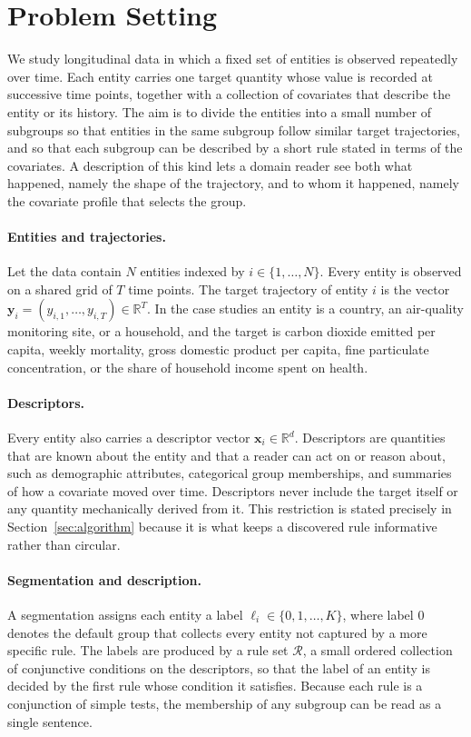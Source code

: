 \section{Problem Setting}
\label{sec:problem}

We study longitudinal data in which a fixed set of entities is observed repeatedly over time. Each entity carries one target quantity whose value is recorded at successive time points, together with a collection of covariates that describe the entity or its history. The aim is to divide the entities into a small number of subgroups so that entities in the same subgroup follow similar target trajectories, and so that each subgroup can be described by a short rule stated in terms of the covariates. A description of this kind lets a domain reader see both what happened, namely the shape of the trajectory, and to whom it happened, namely the covariate profile that selects the group.

\paragraph{Entities and trajectories.} Let the data contain $N$ entities indexed by $i \in \{1, \dots, N\}$. Every entity is observed on a shared grid of $T$ time points. The target trajectory of entity $i$ is the vector $\mathbf{y}_i = (y_{i,1}, \dots, y_{i,T}) \in \mathbb{R}^T$. In the case studies an entity is a country, an air-quality monitoring site, or a household, and the target is carbon dioxide emitted per capita, weekly mortality, gross domestic product per capita, fine particulate concentration, or the share of household income spent on health.

\paragraph{Descriptors.} Every entity also carries a descriptor vector $\mathbf{x}_i \in \mathbb{R}^d$. Descriptors are quantities that are known about the entity and that a reader can act on or reason about, such as demographic attributes, categorical group memberships, and summaries of how a covariate moved over time. Descriptors never include the target itself or any quantity mechanically derived from it. This restriction is stated precisely in Section~\ref{sec:algorithm} because it is what keeps a discovered rule informative rather than circular.

\paragraph{Segmentation and description.} A segmentation assigns each entity a label $\ell_i \in \{0, 1, \dots, K\}$, where label $0$ denotes the default group that collects every entity not captured by a more specific rule. The labels are produced by a rule set $\mathcal{R}$, a small ordered collection of conjunctive conditions on the descriptors, so that the label of an entity is decided by the first rule whose condition it satisfies. Because each rule is a conjunction of simple tests, the membership of any subgroup can be read as a single sentence.

